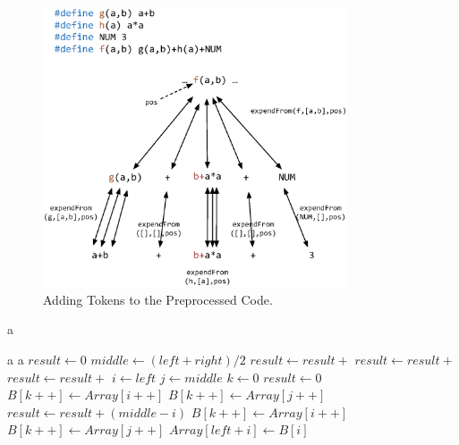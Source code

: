 \documentclass[11pt]{article}
\theoremstyle{theorem}
\theoremstyle{lemma}
\theoremstyle{property}
\theoremstyle{definition}
\theoremstyle{assumption}
\begin{document}
\begin{figure}[H]
\centering
\includegraphics[width=9cm]{add_case.eps}
\caption{Adding Tokens to the Preprocessed Code.}
\end{figure}

\newpage
    \begin{algorithm}
        \caption{a}
        \begin{algorithmic}[1] 
            \Require a
            \Ensure a
                \State $result \gets 0$
                    \State $middle \gets (left + right) / 2$
                    \State $result \gets result +$ 
                    \State $result \gets result +$ 
                    \State $result \gets result +$ 
                \EndIf
                \State {}
            \EndFunction
            \State
                \State $i\gets left$
                \State $j\gets middle$
                \State $k\gets 0$
                \State $result \gets 0$
                        \State $B[k++]\gets Array[i++]$
                    \Else
                        \State $B[k++] \gets Array[j++]$
                        \State $result \gets result + (middle - i)$
                    \EndIf
                \EndWhile
                    \State $B[k++] \gets Array[i++]$
                \EndWhile
                    \State $B[k++] \gets Array[j++]$
                \EndWhile
                    \State $Array[left + i] \gets B[i]$
                \EndFor
                \State {}
            \EndFunction
        \end{algorithmic}
    \end{algorithm}
\end{document}
